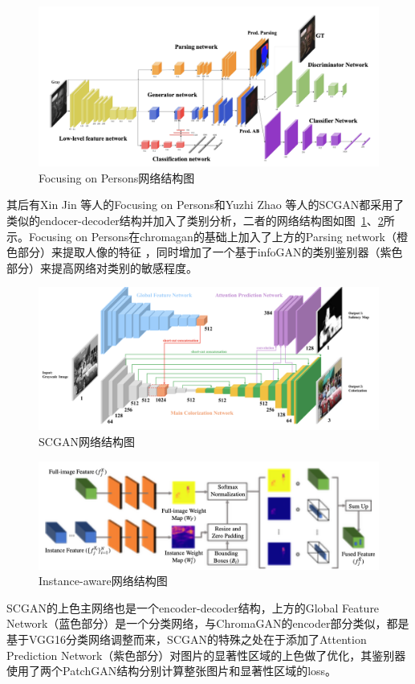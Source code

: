 \documentclass[conference]{IEEEtran}
\begin{document}
\begin{figure}[h]
    \centerline{\includegraphics[totalheight = 1.6in]{jin2021focusing.png}}
    \caption{Focusing on Persons网络结构图}
    \label{jin2021focusing}
    \end{figure}

其后有Xin Jin 等人的Focusing on Persons\cite{jin2021focusing}和Yuzhi Zhao 等人的SCGAN\cite{2020SCGAN}都采用了类似的endocer-decoder结构并加入了类别分析，二者的网络结构图如图~\ref{jin2021focusing}、\ref{2020SCGAN}所示。Focusing on Persons在chromagan的基础上加入了上方的Parsing network（橙色部分）来提取人像的特征 ，同时增加了一个基于infoGAN\cite{chen2016infogan}的类别鉴别器（紫色部分）来提高网络对类别的敏感程度。

\begin{figure}[h]
    \centerline{\includegraphics[totalheight = 1.5in]{2020SCGAN.png}}
    \caption{SCGAN网络结构图}
    \label{2020SCGAN}
    \end{figure}
\begin{figure}[h]
    \centerline{\includegraphics[totalheight = 1.6in]{2020Instance.png}}
    \caption{Instance-aware网络结构图}
    \label{2020Instance}
    \end{figure}
SCGAN的上色主网络也是一个encoder-decoder结构，上方的Global Feature Network（蓝色部分）是一个分类网络，与ChromaGAN的encoder部分类似，都是基于VGG16\cite{simonyan2014very}分类网络调整而来，SCGAN的特殊之处在于添加了Attention Prediction Network（紫色部分）对图片的显著性区域的上色做了优化，其鉴别器使用了两个PatchGAN结构分别计算整张图片和显著性区域的loss。
\end{document}
